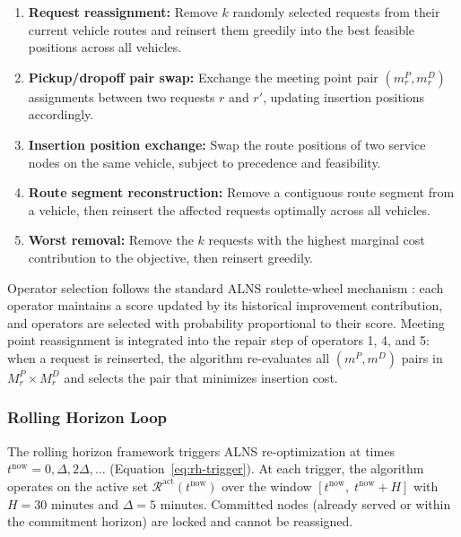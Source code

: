 \begin{enumerate}
  \item \textbf{Request reassignment:} Remove $k$ randomly selected requests from their
        current vehicle routes and reinsert them greedily into the best feasible positions
        across all vehicles.
  \item \textbf{Pickup/dropoff pair swap:} Exchange the meeting point pair
        $(m_r^P, m_r^D)$ assignments between two requests $r$ and $r'$, updating
        insertion positions accordingly.
  \item \textbf{Insertion position exchange:} Swap the route positions of two service
        nodes on the same vehicle, subject to precedence and feasibility.
  \item \textbf{Route segment reconstruction:} Remove a contiguous route segment from a
        vehicle, then reinsert the affected requests optimally across all vehicles.
  \item \textbf{Worst removal:} Remove the $k$ requests with the highest marginal cost
        contribution to the objective, then reinsert greedily.
\end{enumerate}

Operator selection follows the standard ALNS roulette-wheel mechanism
\citep{ropke2006}: each operator maintains a score updated by its historical improvement
contribution, and operators are selected with probability proportional to their score.
Meeting point reassignment is integrated into the repair step of operators 1, 4, and 5:
when a request is reinserted, the algorithm re-evaluates all $(m^P, m^D)$ pairs in
$M_r^P \times M_r^D$ and selects the pair that minimizes insertion cost.

\subsubsection{Rolling Horizon Loop}

The rolling horizon framework \citep{bent2004} triggers ALNS re-optimization at times
$t^{\text{now}} = 0, \Delta, 2\Delta, \ldots$ (Equation~\ref{eq:rh-trigger}). At each
trigger, the algorithm operates on the active set
$\mathcal{R}^{\text{act}}(t^{\text{now}})$ over the window
$[t^{\text{now}},\; t^{\text{now}} + H]$ with $H = 30$ minutes and $\Delta = 5$ minutes.
Committed nodes (already served or within the commitment horizon) are locked and cannot
be reassigned.

